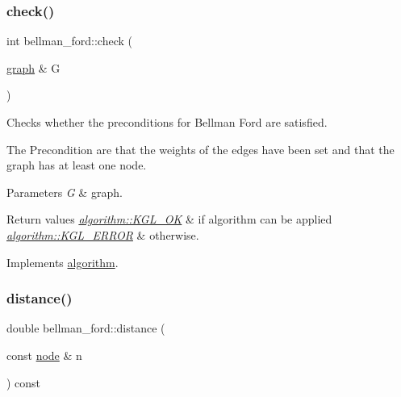 \subsubsection{\texorpdfstring{check()}{check()}}
{\footnotesize\ttfamily int bellman\+\_\+ford\+::check (\begin{DoxyParamCaption}\item[{\mbox{\hyperlink{classgraph}{graph}} \&}]{G }\end{DoxyParamCaption})\hspace{0.3cm}{\ttfamily [virtual]}}



Checks whether the preconditions for Bellman Ford are satisfied. 

The Precondition are that the weights of the edges have been set and that the graph has at least one node.


\begin{DoxyParams}{Parameters}
{\em G} & graph. \\
\hline
\end{DoxyParams}

\begin{DoxyRetVals}{Return values}
{\em \mbox{\hyperlink{classalgorithm_af1a0078e153aa99c24f9bdf0d97f6710aae4c1cd7fe8d8cf4b143241a6e7c31cf}{algorithm\+::\+K\+G\+L\+\_\+\+OK}}} & if algorithm can be applied \\
\hline
{\em \mbox{\hyperlink{classalgorithm_af1a0078e153aa99c24f9bdf0d97f6710ae67bf27b2ef31f73e545a7f9f4a69556}{algorithm\+::\+K\+G\+L\+\_\+\+E\+R\+R\+OR}}} & otherwise. \\
\hline
\end{DoxyRetVals}


Implements \mbox{\hyperlink{classalgorithm_a76361fb03ad1cf643affc51821e43bed}{algorithm}}.

\mbox{\label{classbellman__ford_a881e5b021e69aced997185208438f910}} 
\subsubsection{\texorpdfstring{distance()}{distance()}}
{\footnotesize\ttfamily double bellman\+\_\+ford\+::distance (\begin{DoxyParamCaption}\item[{const \mbox{\hyperlink{classnode}{node}} \&}]{n }\end{DoxyParamCaption}) const\hspace{0.3cm}{\ttfamily [inline]}}



